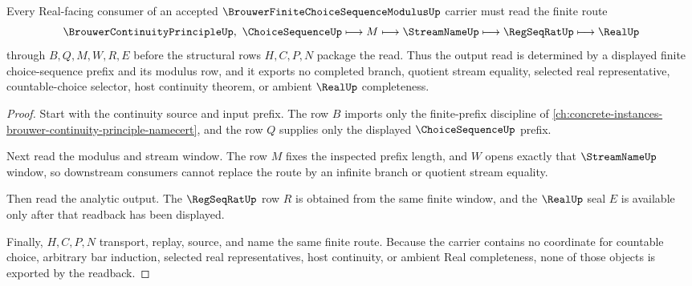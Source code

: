 \begin{theorem}
\label{thm:brouwer-finite-choice-sequence-real-readback}
Every Real-facing consumer of an accepted $\BrouwerFiniteChoiceSequenceModulusUp$ carrier must read the finite route
$$
\BrouwerContinuityPrincipleUp,\ \ChoiceSequenceUp
\longmapsto M
\longmapsto \StreamNameUp
\longmapsto \RegSeqRatUp
\longmapsto \RealUp
$$
through $B,Q,M,W,R,E$ before the structural rows $H,C,P,N$ package the read. Thus the output read is determined by a displayed finite choice-sequence prefix and its modulus row, and it exports no completed branch, quotient stream equality, selected real representative, countable-choice selector, host continuity theorem, or ambient $\RealUp$ completeness.
\end{theorem}
\begin{proof}
Start with the continuity source and input prefix. The row $B$ imports only the finite-prefix discipline of \autoref{ch:concrete-instances-brouwer-continuity-principle-namecert}, and the row $Q$ supplies only the displayed $\ChoiceSequenceUp$ prefix.

Next read the modulus and stream window. The row $M$ fixes the inspected prefix length, and $W$ opens exactly that $\StreamNameUp$ window, so downstream consumers cannot replace the route by an infinite branch or quotient stream equality.

Then read the analytic output. The $\RegSeqRatUp$ row $R$ is obtained from the same finite window, and the $\RealUp$ seal $E$ is available only after that readback has been displayed.

Finally, $H,C,P,N$ transport, replay, source, and name the same finite route. Because the carrier contains no coordinate for countable choice, arbitrary bar induction, selected real representatives, host continuity, or ambient Real completeness, none of those objects is exported by the readback.
\end{proof}



